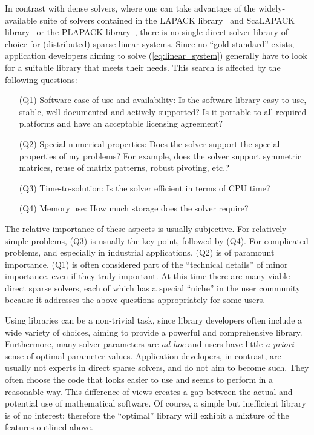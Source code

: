 \documentclass[acmtoms,acmnow]{acmtrans2m}
\begin{document}
In contrast with dense solvers, where one can take advantage of the
widely-available suite of solvers contained in the LAPACK
library~\cite{lapack-guide} and ScaLAPACK
library~\cite{scalapack-guide} or the PLAPACK
library~\cite{alpatov97plapack}, there is no single direct solver
library of choice for (distributed) sparse linear systems. Since no
``gold standard'' exists, application developers aiming to solve
(\ref{eq:linear_system}) generally have to look for a suitable
library that meets their needs. This search is affected by the
following questions:
\begin{enumerate}
\item[(Q1)] Software ease-of-use and availability: Is the software library easy to use,
stable, well-documented and actively supported?  Is it portable to
all required platforms and have an acceptable licensing agreement?
\item[(Q2)] Special numerical properties:  Does the solver support the special properties of my problems?
For example, does the solver support symmetric matrices, reuse of
matrix patterns, robust pivoting, etc.?
\item[(Q3)] Time-to-solution: Is the solver efficient in terms of CPU time?
\item[(Q4)] Memory use: How much storage does the solver require?
\end{enumerate}
The relative importance of these aspects is usually subjective. For
relatively simple problems, (Q3) is usually the key point, followed
by (Q4). For complicated problems, and especially in industrial
applications, (Q2) is of paramount importance. (Q1) is often
considered part of the ``technical details'' of minor importance,
even if they truly important.  At this time there are many viable
direct sparse solvers, each of which has a special ``niche'' in the
user community because it addresses the above questions
appropriately for some users.

Using libraries can be a non-trivial task, since library developers
often include a wide variety of choices, aiming to provide a
powerful and comprehensive library. Furthermore, many solver
parameters are \textit{ad hoc} and users have little \textit{a
priori} sense of optimal parameter values.  Application developers,
in contrast, are usually not experts in direct sparse solvers, and
do not aim to become such. They often choose the code that looks
easier to use and seems to perform in a reasonable way. This
difference of views creates a gap between the actual and potential
use of mathematical software. Of course, a simple but inefficient
library is of no interest; therefore the ``optimal'' library will
exhibit a mixture of the features outlined above.
\end{document}
